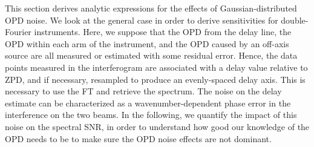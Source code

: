 

This section derives analytic expressions for the effects of Gaussian-distributed OPD noise. We look at the general case in order to derive sensitivities for double-Fourier instruments. Here, we suppose that the OPD from the delay line, the OPD within each arm of the instrument, and the OPD caused by an off-axis source are all measured or estimated with some residual error. Hence, the data points measured in the interferogram are associated with a delay value relative to ZPD, and if necessary, resampled to produce an evenly-spaced delay axis. This is necessary to use the FT and retrieve the spectrum. The noise on the delay estimate can be
characterized as a wavenumber-dependent phase error in the interference on the two beams. In the following, we quantify the impact of this noise on the spectral SNR, in order to understand how good our knowledge of the OPD needs to be to make sure the OPD noise effects are not dominant.


